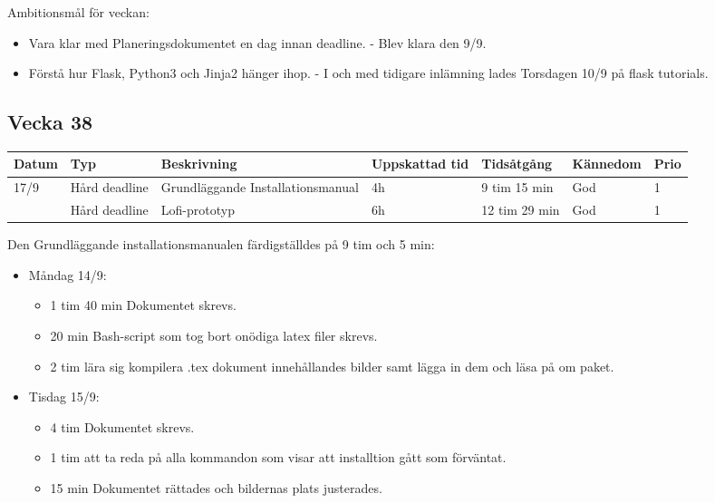 \documentclass{TDP003mall}
\begin{document}
      Ambitionsmål för veckan:
      \begin{itemize}
      \item Vara klar med Planeringsdokumentet en dag innan deadline. - Blev klara den 9/9.
      \item Förstå hur Flask, Python3 och Jinja2 hänger ihop. - I och med tidigare inlämning lades Torsdagen 10/9 på flask tutorials.
      \end{itemize}
      

\newpage


\subsection{Vecka 38}
\begin{tabularx}{\linewidth}{|l|l|X|l|l|l|l|}
	\hline
	Datum & Typ           & Beskrivning                       & Uppskattad tid & Tidsåtgång    & Kännedom & Prio \\ [0.5ex]
	\hline                                                    
	17/9  & Hård deadline & Grundläggande Installationsmanual & 4h             & 9 tim 15 min  & God      & 1    \\
	\hline                                                    
          & Hård deadline & Lofi-prototyp                     & 6h             & 12 tim 29 min & God      & 1    \\
	\hline
\end{tabularx}

Den Grundläggande installationsmanualen färdigställdes på 9 tim och 5 min:
\begin{itemize}
	\item Måndag 14/9:
	\begin{itemize}
		\item 1 tim 40 min Dokumentet skrevs.
		\item 20 min Bash-script som tog bort onödiga latex filer skrevs.
		\item 2 tim lära sig kompilera .tex dokument innehållandes bilder samt lägga in dem och läsa på om paket.
	\end{itemize}
	\item Tisdag 15/9:
	\begin{itemize}
		\item 4 tim Dokumentet skrevs.
		\item 1 tim att ta reda på alla kommandon som visar att installtion gått som förväntat.
		\item 15 min Dokumentet rättades och bildernas plats justerades.\\
	\end{itemize}
\end{itemize}
\end{document}
